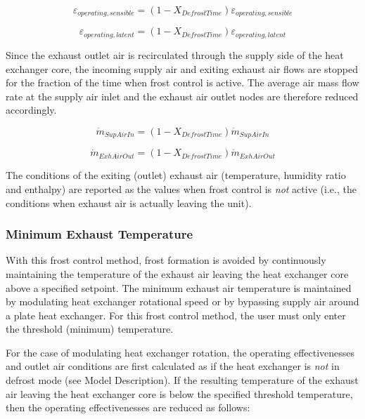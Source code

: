 \begin{equation}
{\varepsilon_{operating,sensible}} = (1 - {X_{DefrostTime}}){\varepsilon_{operating,sensible}}
\end{equation}

\begin{equation}
{\varepsilon_{operating,latent}} = (1 - {X_{DefrostTime}}){\varepsilon_{operating,latent}}
\end{equation}

Since the exhaust outlet air is recirculated through the supply side of the heat exchanger core, the incoming supply air and exiting exhaust air flows are stopped for the fraction of the time when frost control is active. The average air mass flow rate at the supply air inlet and the exhaust air outlet nodes are therefore reduced accordingly.

\begin{equation}
{\dot{m}_{SupAirIn}} = (1 - {X_{DefrostTime}}){\dot{m}_{SupAirIn}}
\end{equation}

\begin{equation}
{\dot{m}_{ExhAirOut}} = (1 - {X_{DefrostTime}}){\dot{m}_{ExhAirOut}}
\end{equation}

The conditions of the exiting (outlet) exhaust air (temperature, humidity ratio and enthalpy) are reported as the values when frost control is \emph{not} active (i.e., the conditions when exhaust air is actually leaving the unit).

\subsubsection{Minimum Exhaust Temperature}\label{minimum-exhaust-temperature}

With this frost control method, frost formation is avoided by continuously maintaining the temperature of the exhaust air leaving the heat exchanger core above a specified setpoint. The minimum exhaust air temperature is maintained by modulating heat exchanger rotational speed or by bypassing supply air around a plate heat exchanger. For this frost control method, the user must only enter the threshold (minimum) temperature.

For the case of modulating heat exchanger rotation, the operating effectivenesses and outlet air conditions are first calculated as if the heat exchanger is \emph{not} in defrost mode (see Model Description). If the resulting temperature of the exhaust air leaving the heat exchanger core is below the specified threshold temperature, then the operating effectivenesses are reduced as follows:

